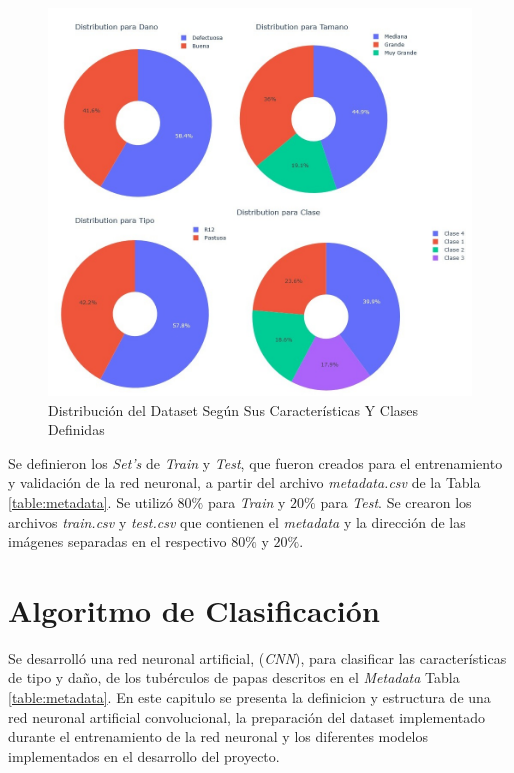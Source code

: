 	\begin{figure}[ht]
		\centering
		\includegraphics[scale=0.4]{Figs/Distribucion.jpg}
		\caption{Distribución del Dataset Según Sus Características Y Clases Definidas}
		\label{fig:distribuciontipo}
	\end{figure}

	Se definieron los \textit{Set's} de \textit{Train} y \textit{Test}, que fueron creados para el entrenamiento y validación de la red neuronal, a partir del archivo \textit{metadata.csv} de la Tabla \ref{table:metadata}. Se utilizó $80\%$ para \textit{Train} y $20\%$ para \textit{Test}. Se crearon los archivos \textit{train.csv} y \textit{test.csv} que contienen el \textit{metadata} y la dirección de las imágenes separadas en el respectivo $80\%$ y $20\%$.



\chapter{Algoritmo de Clasificación}

Se desarrolló una red neuronal artificial, (\textit{CNN}), para clasificar las características de tipo y daño, de los tubérculos de papas descritos en el \textit{Metadata} Tabla \ref{table:metadata}. En este capitulo se presenta la definicion y estructura de una red neuronal artificial convolucional, la preparación del dataset implementado durante el entrenamiento de la red neuronal y los diferentes modelos implementados en el desarrollo del proyecto.

